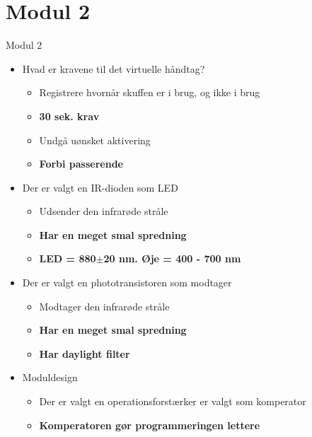 \documentclass{beamer}
\begin{document}
\section{Modul 2}
\begin{frame}{Modul 2}

\begin{itemize}
\item Hvad er kravene til det virtuelle håndtag?
\begin{itemize}
\item Registrere hvornår skuffen er i brug, og ikke i brug
\item \textbf{30 sek. krav}
\item Undgå uønsket aktivering
\item \textbf{Forbi passerende}
\end{itemize}

\item Der er valgt en IR-dioden som LED
\begin{itemize}
\item Udsender den infrarøde stråle
\item \textbf{Har en meget smal spredning}
\item \textbf{LED = 880$\pm$20 nm. Øje = 400 - 700 nm}
\end{itemize}

\item Der er valgt en phototransistoren som modtager
\begin{itemize}
\item Modtager den infrarøde stråle
\item \textbf{Har en meget smal spredning}
\item \textbf{Har daylight filter}
\end{itemize}

\item Moduldesign
\begin{itemize}
\item Der er valgt en operationsforstærker er valgt som komperator
\item \textbf{Komperatoren gør programmeringen lettere}
\end{itemize}

\end{itemize}
\end{frame}
\end{document}
